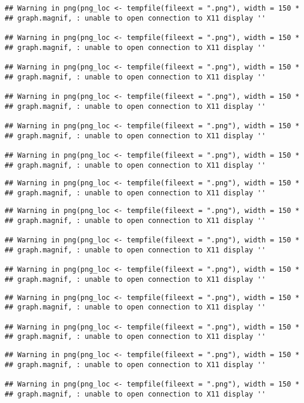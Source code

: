 \documentclass[]{article}
\begin{document}
\begin{verbatim}
## Warning in png(png_loc <- tempfile(fileext = ".png"), width = 150 *
## graph.magnif, : unable to open connection to X11 display ''

## Warning in png(png_loc <- tempfile(fileext = ".png"), width = 150 *
## graph.magnif, : unable to open connection to X11 display ''

## Warning in png(png_loc <- tempfile(fileext = ".png"), width = 150 *
## graph.magnif, : unable to open connection to X11 display ''

## Warning in png(png_loc <- tempfile(fileext = ".png"), width = 150 *
## graph.magnif, : unable to open connection to X11 display ''

## Warning in png(png_loc <- tempfile(fileext = ".png"), width = 150 *
## graph.magnif, : unable to open connection to X11 display ''

## Warning in png(png_loc <- tempfile(fileext = ".png"), width = 150 *
## graph.magnif, : unable to open connection to X11 display ''
\end{verbatim}

\begin{verbatim}
## Warning in png(png_loc <- tempfile(fileext = ".png"), width = 150 *
## graph.magnif, : unable to open connection to X11 display ''
\end{verbatim}

\begin{verbatim}
## Warning in png(png_loc <- tempfile(fileext = ".png"), width = 150 *
## graph.magnif, : unable to open connection to X11 display ''

## Warning in png(png_loc <- tempfile(fileext = ".png"), width = 150 *
## graph.magnif, : unable to open connection to X11 display ''

## Warning in png(png_loc <- tempfile(fileext = ".png"), width = 150 *
## graph.magnif, : unable to open connection to X11 display ''
\end{verbatim}

\begin{verbatim}
## Warning in png(png_loc <- tempfile(fileext = ".png"), width = 150 *
## graph.magnif, : unable to open connection to X11 display ''

## Warning in png(png_loc <- tempfile(fileext = ".png"), width = 150 *
## graph.magnif, : unable to open connection to X11 display ''
\end{verbatim}

\begin{verbatim}
## Warning in png(png_loc <- tempfile(fileext = ".png"), width = 150 *
## graph.magnif, : unable to open connection to X11 display ''

## Warning in png(png_loc <- tempfile(fileext = ".png"), width = 150 *
## graph.magnif, : unable to open connection to X11 display ''
\end{verbatim}
\end{document}
